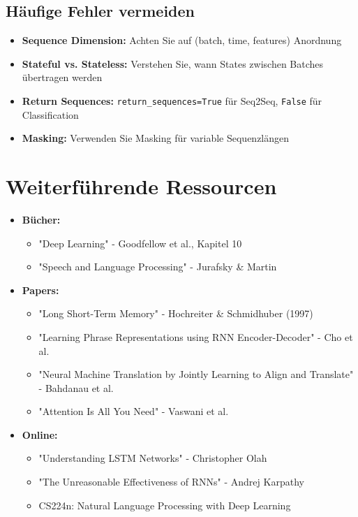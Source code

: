 \documentclass[12pt,a4paper]{article}
\begin{document}
\subsection*{Häufige Fehler vermeiden}
\begin{itemize}
    \item \textbf{Sequence Dimension:} Achten Sie auf (batch, time, features) Anordnung
    \item \textbf{Stateful vs. Stateless:} Verstehen Sie, wann States zwischen Batches übertragen werden
    \item \textbf{Return Sequences:} \texttt{return\_sequences=True} für Seq2Seq, \texttt{False} für Classification
    \item \textbf{Masking:} Verwenden Sie Masking für variable Sequenzlängen
\end{itemize}

\section*{Weiterführende Ressourcen}

\begin{itemize}
    \item \textbf{Bücher:}
    \begin{itemize}
        \item "Deep Learning" - Goodfellow et al., Kapitel 10
        \item "Speech and Language Processing" - Jurafsky \& Martin
    \end{itemize}
    \item \textbf{Papers:}
    \begin{itemize}
        \item "Long Short-Term Memory" - Hochreiter \& Schmidhuber (1997)
        \item "Learning Phrase Representations using RNN Encoder-Decoder" - Cho et al.
        \item "Neural Machine Translation by Jointly Learning to Align and Translate" - Bahdanau et al.
        \item "Attention Is All You Need" - Vaswani et al.
    \end{itemize}
    \item \textbf{Online:}
    \begin{itemize}
        \item "Understanding LSTM Networks" - Christopher Olah
        \item "The Unreasonable Effectiveness of RNNs" - Andrej Karpathy
        \item CS224n: Natural Language Processing with Deep Learning
    \end{itemize}
\end{itemize}
\end{document}
